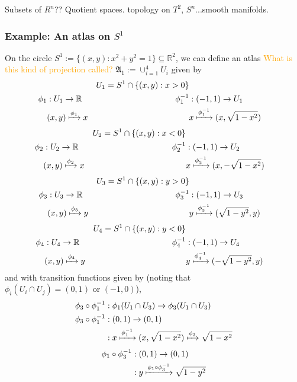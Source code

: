 \documentclass[a4paper]{article}
\theoremstyle{definition} \newtheorem*{definition}{Definition}
\theoremstyle{definition} \newtheorem*{definitions}{Definitions}
\theoremstyle{plain} \newtheorem{theorem}{Theorem}[section]
\theoremstyle{plain} \newtheorem{proposition}[theorem]{Proposition}
\theoremstyle{plain} \newtheorem{corollary}[theorem]{Corollary}
\theoremstyle{plain} \newtheorem{lemma}[theorem]{Lemma}
\theoremstyle{plain} \newtheorem{example}[theorem]{Example}
\newcommand{\question}[1]{\textcolor{orange}{#1}}
\newcommand{\realnos}{\mathbb{R}}
\begin{document}
Subsets of $R^n$?? Quotient spaces.
topology on $T^2$, $S^n$...smooth manifolds.

\subsubsection{Example: An atlas on $S^1$}

On the circle $S^1:=\{(x, y): x^2+y^2 = 1\}\subseteq \realnos^2$, we can define an atlas \question{What is this kind of projection called?} $\mathfrak{A}_1 :=\cup_{i=1}^4 U_i$ given by 
\begin{align*}
&& U_1 = S^1 \cap \{(x, y): x>0 \} \\
\phi_1 & : U_1\to \realnos &
\phi_1^{-1} & :(-1, 1)\to U_1 \\
& (x,y) \xmapsto{\phi_1} x 
& & x \xmapsto{\phi_1^{-1}} (x, \sqrt{1-x^2})
\end{align*}
\begin{align*}
&& U_2 = S^1 \cap \{(x, y): x<0 \} \\
\phi_2 & : U_2\to \realnos &
\phi_2^{-1} & :(-1, 1)\to U_2 \\
& (x,y) \xmapsto{\phi_2} x 
& & x \xmapsto{\phi_2^{-1}} (x, - \sqrt{1-x^2})
\end{align*}
\begin{align*}
&& U_3 = S^1 \cap \{(x, y): y>0 \} \\
\phi_3 & : U_3\to \realnos &
\phi_3^{-1} & :(-1, 1)\to U_3 \\
& (x,y) \xmapsto{\phi_3} y
& & y \xmapsto{\phi_3^{-1}} (\sqrt{1-y^2}, y)
\end{align*}
\begin{align*}
&& U_4 = S^1 \cap \{(x, y): y<0 \} \\
\phi_4 & : U_4\to \realnos &
\phi_4^{-1} & :(-1, 1)\to U_4 \\
& (x,y) \xmapsto{\phi_4} y
& & y \xmapsto{\phi_4^{-1}} (- \sqrt{1-y^2}, y)
\end{align*}
and with transition functions given by (noting that $\phi_i(U_i\cap U_j) = (0, 1) \text{ or } (-1, 0)$), 
\begin{align*}
\phi_3 \circ \phi_1^{-1} & :\phi_1(U_1\cap U_3)\to \phi_3(U_1 \cap U_3) \\
\phi_3 \circ \phi_1^{-1} & : (0,1) \to (0,1) \\
& : x \xmapsto{\phi_1^{-1}} (x, \sqrt{1-x^2}) \xmapsto{\phi_3} \sqrt{1-x^2}
\end{align*}
\begin{align*}
\phi_1 \circ \phi_3^{-1} & : (0,1) \to (0,1) \\
& : y \xmapsto{\phi_1 \circ \phi_3^{-1}}  \sqrt{1-y^2}
\end{align*}
\end{document}
